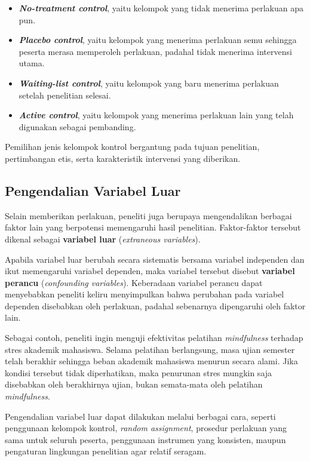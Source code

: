 \documentclass[
  indonesian,
  letterpaper,
  DIV=11,
  numbers=noendperiod]{scrreprt}
\providecommand{\tightlist}{%
  \setlength{\itemsep}{0pt}\setlength{\parskip}{0pt}}
\begin{document}
\begin{itemize}
\tightlist
\item
  \textbf{\emph{No-treatment control}}, yaitu kelompok yang tidak
  menerima perlakuan apa pun.
\item
  \textbf{\emph{Placebo control}}, yaitu kelompok yang menerima
  perlakuan semu sehingga peserta merasa memperoleh perlakuan, padahal
  tidak menerima intervensi utama.
\item
  \textbf{\emph{Waiting-list control}}, yaitu kelompok yang baru
  menerima perlakuan setelah penelitian selesai.
\item
  \textbf{\emph{Active control}}, yaitu kelompok yang menerima perlakuan
  lain yang telah digunakan sebagai pembanding.
\end{itemize}

Pemilihan jenis kelompok kontrol bergantung pada tujuan penelitian,
pertimbangan etis, serta karakteristik intervensi yang diberikan.

\subsection{Pengendalian Variabel
Luar}\label{pengendalian-variabel-luar}

Selain memberikan perlakuan, peneliti juga berupaya mengendalikan
berbagai faktor lain yang berpotensi memengaruhi hasil penelitian.
Faktor-faktor tersebut dikenal sebagai \textbf{variabel luar}
(\emph{extraneous variables}).

Apabila variabel luar berubah secara sistematis bersama variabel
independen dan ikut memengaruhi variabel dependen, maka variabel
tersebut disebut \textbf{variabel perancu} (\emph{confounding
variables}). Keberadaan variabel perancu dapat menyebabkan peneliti
keliru menyimpulkan bahwa perubahan pada variabel dependen disebabkan
oleh perlakuan, padahal sebenarnya dipengaruhi oleh faktor lain.

Sebagai contoh, peneliti ingin menguji efektivitas pelatihan
\emph{mindfulness} terhadap stres akademik mahasiswa. Selama pelatihan
berlangsung, masa ujian semester telah berakhir sehingga beban akademik
mahasiswa menurun secara alami. Jika kondisi tersebut tidak
diperhatikan, maka penurunan stres mungkin saja disebabkan oleh
berakhirnya ujian, bukan semata-mata oleh pelatihan \emph{mindfulness}.

Pengendalian variabel luar dapat dilakukan melalui berbagai cara,
seperti penggunaan kelompok kontrol, \emph{random assignment}, prosedur
perlakuan yang sama untuk seluruh peserta, penggunaan instrumen yang
konsisten, maupun pengaturan lingkungan penelitian agar relatif seragam.
\end{document}
